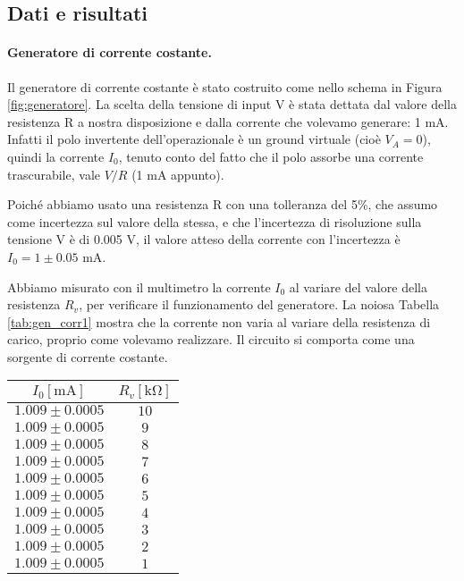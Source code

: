 \subsection{Dati e risultati}

\paragraph{Generatore di corrente costante.}

Il generatore di corrente costante è stato costruito come nello schema in
Figura \ref{fig:generatore}. La scelta della tensione di input V è stata dettata
dal valore della resistenza R a nostra disposizione e dalla corrente che volevamo
generare: 1 mA. Infatti il polo invertente dell'operazionale è un ground virtuale
(cioè $V_A = 0$), quindi la corrente $I_0$, tenuto conto del fatto che il polo
assorbe una corrente trascurabile, vale $V/R$ (1 mA appunto). 

Poiché abbiamo usato una resistenza R con una tolleranza del 5\%,
che assumo come incertezza sul valore della stessa, e che l'incertezza di risoluzione
sulla tensione V è di 0.005 V, il valore atteso della corrente con l'incertezza è
$I_0 = 1 \pm 0.05$ mA.

Abbiamo misurato con il multimetro la corrente $I_0$ al variare del valore della
resistenza $R_v$, per verificare il funzionamento del generatore. La noiosa
Tabella \ref{tab:gen_corr1} mostra che la corrente non varia al variare della resistenza
di carico, proprio come volevamo realizzare. Il circuito si comporta come
una sorgente di corrente costante.

\begin{SCtable}[1][h]
    \centering
    \begin{tabular}{c c}
        \toprule
            $I_0 [\si{\milli\ampere}]$ & $R_v [\si{\kilo\ohm}]$ \\
        \midrule
            $ 1.009 \pm 0.0005 $ & $ 10 $ \\
            $ 1.009 \pm 0.0005 $ & $ 9 $ \\
            $ 1.009 \pm 0.0005 $ & $ 8 $ \\
            $ 1.009 \pm 0.0005 $ & $ 7 $ \\
            $ 1.009 \pm 0.0005 $ & $ 6 $ \\
            $ 1.009 \pm 0.0005 $ & $ 5 $ \\
            $ 1.009 \pm 0.0005 $ & $ 4 $ \\
            $ 1.009 \pm 0.0005 $ & $ 3 $ \\
            $ 1.009 \pm 0.0005 $ & $ 2 $ \\
            $ 1.009 \pm 0.0005 $ & $ 1 $ \\
        \bottomrule
    \end{tabular}
    \caption{La corrente nel circuito \ref{fig:generatore} rimane costante
        al variare della resistenza di carico $R_v$. Le incertezze riportare sul
        valore di corrente sono incertezze di risoluzione del multimetro
        (metà della risoluzione), mentre sui valori di resistenza non sono riportate
        perchè non rilevanti (sono comunque dell'ordine di qualche ohm).}
    \label{tab:gen_corr1}
\end{SCtable}

